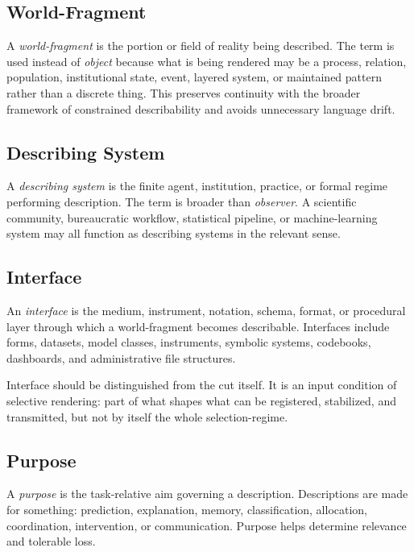 \documentclass[11pt]{article}
\renewcommand{\emph}[1]{\textit{#1}}
\begin{document}
\subsection{World-Fragment}

A \emph{world-fragment} is the portion or field of reality being described. The term is used instead of \emph{object} because what is being rendered may be a process, relation, population, institutional state, event, layered system, or maintained pattern rather than a discrete thing. This preserves continuity with the broader framework of constrained describability and avoids unnecessary language drift.

\subsection{Describing System}

A \emph{describing system} is the finite agent, institution, practice, or formal regime performing description. The term is broader than \emph{observer}. A scientific community, bureaucratic workflow, statistical pipeline, or machine-learning system may all function as describing systems in the relevant sense.

\subsection{Interface}

An \emph{interface} is the medium, instrument, notation, schema, format, or procedural layer through which a world-fragment becomes describable. Interfaces include forms, datasets, model classes, instruments, symbolic systems, codebooks, dashboards, and administrative file structures. \cite{adriaans_information_sep,star_ethnography_of_infrastructure,bowker_star_sorting_things_out}

Interface should be distinguished from the cut itself. It is an input condition of selective rendering: part of what shapes what can be registered, stabilized, and transmitted, but not by itself the whole selection-regime.

\subsection{Purpose}

A \emph{purpose} is the task-relative aim governing a description. Descriptions are made for something: prediction, explanation, memory, classification, allocation, coordination, intervention, or communication. Purpose helps determine relevance and tolerable loss.
\end{document}
